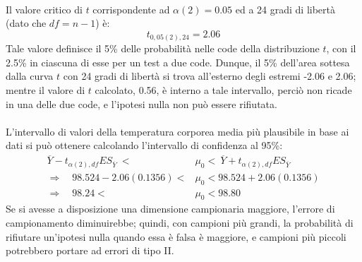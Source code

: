 \documentclass[10pt, draft]{book}
\newcounter{example}[section]
\begin{document}
\begin{example}
    \\
    Il valore critico di $t$ corrispondente ad $\alpha(2) = 0.05$ ed a 24 gradi di libertà (dato che $df = n-1$) è:
    \begin{equation}
        t_{0,05(2),24} = 2.06
    \end{equation}
    Tale valore definisce il 5\% delle probabilità nelle code della distribuzione $t$, con il 2.5\% in ciascuna di esse per un test a due code. Dunque, il 5\% dell'area sottesa dalla curva $t$ con 24 gradi di libertà si trova all'esterno degli estremi -2.06 e 2.06; mentre il valore di $t$ calcolato, 0.56, è interno a tale intervallo, perciò non ricade in una delle due code, e l'ipotesi nulla non può essere rifiutata.
    \\
    \\
    L'intervallo di valori della temperatura corporea media più plausibile in base ai dati si può ottenere calcolando l'intervallo di confidenza al 95\%:
    \begin{align}
        \overline{Y}-t_{\alpha(2),df}ES_{\overline{Y}}\ < &\mu_0 <\ \overline{Y}+t_{\alpha(2),df}ES_{\overline{Y}}
        \\
        \Rightarrow \quad 98.524-2.06(0.1356)<&\mu_0<98.524+2.06(0.1356)
        \\
        \Rightarrow \quad 98.24<&\mu_0<98.80
    \end{align}
    Se si avesse a disposizione una dimensione campionaria maggiore, l'errore di campionamento diminuirebbe; quindi, con campioni più grandi, la probabilità di rifiutare un'ipotesi nulla quando essa è falsa è maggiore, e campioni più piccoli potrebbero portare ad errori di tipo II.
\end{example}
\end{document}
